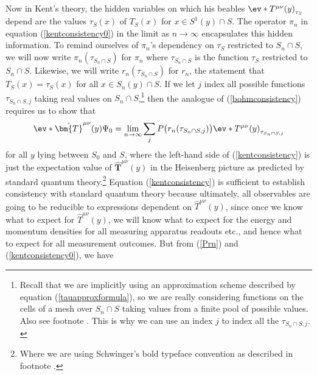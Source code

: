 \documentclass[12pt]{report}
\begin{document}
Now in Kent's theory, the hidden variables on which his beables $\ev*{T^{\mu\nu}(y)}_{\tau_S}$ depend are the values $\tau_S(x)$ of $T_S(x)$ for $x\in S^1(y)\cap S$. The operator $\pi_n$ in equation (\ref{kentconsistency0}) in the limit as $n\rightarrow\infty$ encapsulates this hidden information. To remind ourselves of $\pi_n$'s dependency on $\tau_S$ restricted to $S_n\cap S$, we will now write $\pi_n(\tau_{S_n\cap S})$ for %
%
 $\pi_n$ where $\tau_{S_n\cap S}$ is %
%
the function $\tau_S$ restricted to $S_n\cap S$. Likewise, we will write  $r_n(\tau_{S_n\cap S})$ for  %
%
$r_n$, the statement that $T_S(x)=\tau_S(x)$ for all $x\in S_n(y)\cap S$. If we let $j$ index all possible functions $\tau_{S_n\cap S, j}$ taking real values on $S_n\cap S$,\footnote{Recall that we are implicitly using an approximation scheme described by equation (\ref{tauapproxformula}), so we are really considering functions on the cells of a mesh over $S_n\cap S $ taking values from a finite pool of possible values. Also see footnote . This is why we can use an index $j$ to index all the $\tau_{S_n\cap S, j}.$} then the analogue of (\ref{bohmconsistency}) requires us to show that 
\begin{equation}\label{kentconsistency}
\ev*{\hat{\bm{T}}^{\mu\nu}(y)}{\Psi_0}=\lim_{n\rightarrow\infty}\sum_{j}P\big(r_n(\tau_{S_n\cap S, j})\big)\ev*{T^{\mu\nu}(y)}_{\tau_{S_n\cap S, j}}
\end{equation}
for all $y$ lying between $S_0$ and $S$, where the left-hand side of (\ref{kentconsistency}) is just the expectation value of $\hat{\bm{T}}^{\mu\nu}(y)$ in the Heisenberg picture as predicted by standard quantum theory.\footnote{Where we are using Schwinger's bold typeface convention as described in footnote .} Equation (\ref{kentconsistency}) is sufficient to establish consistency with standard quantum theory because ultimately, all observables are going to be reducible to expressions dependent on $\hat{T}^{\mu\nu}(y)$, since once we know what to expect for $\hat{T}^{\mu\nu}(y)$, we will know what to expect for the energy and momentum densities for all measuring apparatus readouts etc., and hence what to expect for all measurement outcomes. But from (\ref{Prn}) and (\ref{kentconsistency0}), we have 
\end{document}
